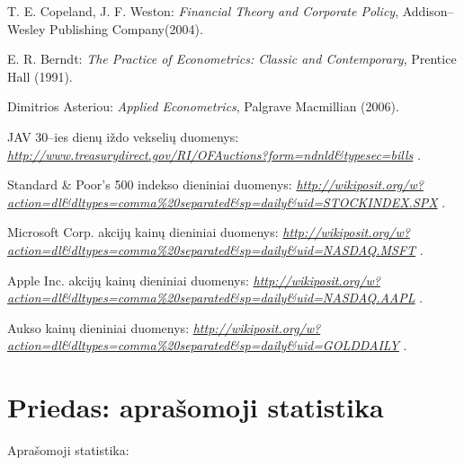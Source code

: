 \documentclass[12pt, a14paper, lithuanian]{article}
\begin{document}
\begin{thebibliography}{99}
\label{mySection}
 T. E. Copeland, J. F. Weston:
\emph{Financial Theory and Corporate Policy},
Addison--Wesley Publishing Company(2004).

 E. R. Berndt:
\emph{The Practice of Econometrics: Classic and Contemporary},
Prentice Hall (1991).

 Dimitrios Asteriou:
\emph{Applied Econometrics},
Palgrave Macmillian (2006).

 JAV 30--ies dienų iždo vekselių duomenys:
\emph{ \url{http://www.treasurydirect.gov/RI/OFAuctions?form=ndnld&typesec=bills} }.

 Standard & Poor's 500 indekso dieniniai duomenys:
\emph{ \url{http://wikiposit.org/w?action=dl\&dltypes=comma\%20separated\&sp=daily\&uid=STOCKINDEX.SPX} }.

 Microsoft Corp. akcijų kainų dieniniai duomenys:
\emph{ \url{http://wikiposit.org/w?action=dl\&dltypes=comma\%20separated\&sp=daily\&uid=NASDAQ.MSFT} }.

 Apple Inc. akcijų kainų dieniniai duomenys:
\emph{ \url{http://wikiposit.org/w?action=dl\&dltypes=comma\%20separated\&sp=daily\&uid=NASDAQ.AAPL} }.

 Aukso kainų dieniniai duomenys:
\emph{ \url{http://wikiposit.org/w?action=dl\&dltypes=comma\%20separated\&sp=daily\&uid=GOLDDAILY} }.

\end{thebibliography}


\newpage

\appendix

\section{Priedas: aprašomoji statistika}
\label{A 1}
Aprašomoji statistika:
\end{document}
